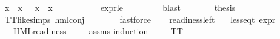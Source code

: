\begin{isabellebody}
\ {\isachardoublequoteopen}{\isacharparenleft}{\kern0pt}x{}{}\ {\isacharbackquote}{\kern0pt}\ x{}{}{\isacharparenright}{\kern0pt}\ {\isacharequal}{\kern0pt}\ {\isacharbraceleft}{\kern0pt}{\isacharbraceright}{\kern0pt}{\isachardoublequoteclose}\ {\isachardoublequoteopen}{\isacharparenleft}{\kern0pt}x{}{}\ {\isacharbackquote}{\kern0pt}\ x{}{}{\isacharparenright}{\kern0pt}\ {\isacharequal}{\kern0pt}\ {\isacharbraceleft}{\kern0pt}{\isacharbraceright}{\kern0pt}{\isachardoublequoteclose}\ \isanewline
\ \ \ \ \ \ \isamarkupfalse%
\ expr{\isacharunderscore}{\kern0pt}{}{\isacharunderscore}{\kern0pt}le{\isacharunderscore}{\kern0pt}{}\ \isanewline
\ \ \ \ \ \ \isamarkupfalse%
\ blast{\isacharplus}{\kern0pt}\isanewline
\ \ \ \ \isamarkupfalse%
\ \isamarkupfalse%
\ {\isacharquery}{\kern0pt}thesis\ \isanewline
\ \ \ \ \ \ \isamarkupfalse%
\ TT{\isacharunderscore}{\kern0pt}like{\isachardot}{\kern0pt}simps\ hml{\isacharunderscore}{\kern0pt}conj\isanewline
\ \ \ \ \ \ \isamarkupfalse%
\ fastforce\isanewline
\ \ \isamarkupfalse%
\isanewline
{}\isamarkupfalse%
%
\endisatagproof
{\isafoldproof}%
%
\isadelimproof
\isanewline
%
\endisadelimproof
\isanewline
{}\isamarkupfalse%
\ readiness{\isacharunderscore}{\kern0pt}left{\isacharcolon}{\kern0pt}\isanewline
\ \ \ {\isachardoublequoteopen}{\isacharparenleft}{\kern0pt}less{\isacharunderscore}{\kern0pt}eq{\isacharunderscore}{\kern0pt}t\ {\isacharparenleft}{\kern0pt}expr\ {\isasymphi}{\isacharparenright}{\kern0pt}\ {\isacharparenleft}{\kern0pt}{\isasyminfinity}{\isacharcomma}{\kern0pt}\ {}{\isacharcomma}{\kern0pt}\ {}{\isacharcomma}{\kern0pt}\ {}{\isacharcomma}{\kern0pt}\ {}{\isacharcomma}{\kern0pt}\ {}{\isacharparenright}{\kern0pt}{\isacharparenright}{\kern0pt}{\isachardoublequoteclose}\isanewline
\ \ \ {\isachardoublequoteopen}HML{\isacharunderscore}{\kern0pt}readiness\ {\isasymphi}{\isachardoublequoteclose}\isanewline
%
\isadelimproof
\ \ %
\endisadelimproof
%
\isatagproof
{}\isamarkupfalse%
\ assms\isanewline
{}\isamarkupfalse%
{\isacharparenleft}{\kern0pt}induction\ {\isasymphi}{\isacharparenright}{\kern0pt}\isanewline
\ \ \isamarkupfalse%
\ TT\isanewline
\ \ \isamarkupfalse%
\ \isamarkupfalse%

\end{isabellebody}
